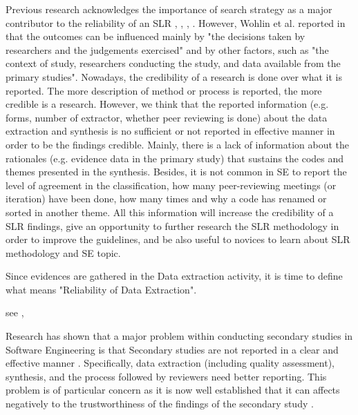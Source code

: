 \documentclass{article}
\newcommand{\todo}[1] {\iffalse #1 \fi} %
\begin{document}
Previous research acknowledges the importance of search strategy as a major contributor to the reliability of an SLR \cite{Ali2018}, \cite{Wohlin2013}, \cite{Kitchenham2012}, \cite{Macdonell2010}. However, Wohlin et al. reported in  \cite{Wohlin2013} that the outcomes can be influenced mainly by "the decisions taken by researchers and the judgements exercised" and by other factors, such as "the context of study, researchers conducting the study, and data available from the primary studies". Nowadays, the credibility of a research is done over what it is reported. The more description of method or process is reported, the more credible is a research. However, we think that the reported information (e.g. forms, number of extractor, whether peer reviewing is done) about the data extraction and synthesis is no sufficient or not reported in effective manner \cite{Budgen2018} in order to be the findings credible. Mainly, there is a lack of information about the rationales (e.g. evidence data in the primary study) that sustains the codes and themes presented in the synthesis. Besides, it is not common in SE to report the level of agreement in the classification, how many peer-reviewing meetings (or iteration) have been done, how many times and why a code has renamed or sorted in another theme. All this information will increase the credibility of a SLR findings,  give an opportunity to further research the SLR methodology in order to improve the guidelines, and be also useful to novices to learn about SLR methodology and SE topic.

Since evidences are gathered in the Data extraction activity, it is time to define what means "Reliability of Data Extraction".



\todo{What are the claims of SLR studies?} see \cite{Ali2018}, \cite{Kitchenham2013}
\todo{What are the benefits of SLR studies?}

    
    
Research has shown that a major problem within conducting secondary studies in Software Engineering is that Secondary studies are not reported in a clear and effective manner \cite{Budgen2018}. Specifically, data extraction (including quality assessment), synthesis, and the process followed by reviewers need better reporting. This problem is of particular concern as it is now well established that it can affects negatively to the trustworthiness of the findings of the secondary study \cite{Cruzes2011}.
\end{document}
